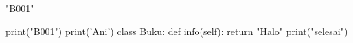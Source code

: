 \documentclass[11pt]{book}
\begin{document}
{\ttfamily{} "B001"}
\begin{kode}
print("B001")
print('Ani')
class Buku:
    def info(self):
        return "Halo"
print("selesai")
\end{kode}
\end{document}
